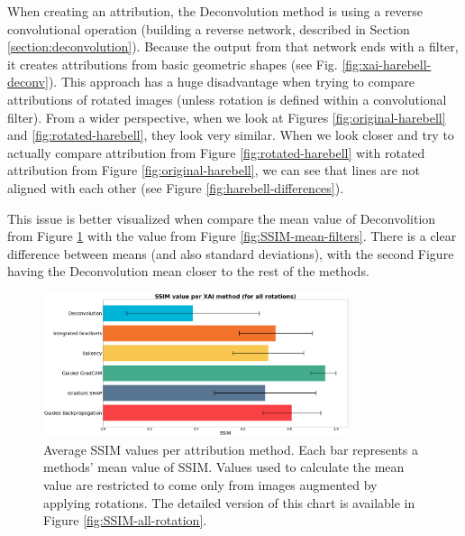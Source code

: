 \vspace{\baselineskip}

When creating an attribution, the Deconvolution method is using a reverse convolutional operation (building a reverse network, described in Section \ref{section:deconvolution}). Because the output from that network ends with a filter, it creates attributions from basic geometric shapes (see Fig. \ref{fig:xai-harebell-deconv}). This approach has a huge disadvantage when trying to compare attributions of rotated images (unless rotation is defined within a convolutional filter). From a wider perspective, when we look at Figures \ref{fig:original-harebell} and \ref{fig:rotated-harebell}, they look very similar. When we look closer and try to actually compare attribution from Figure \ref{fig:rotated-harebell} with rotated attribution from Figure \ref{fig:original-harebell}, we can see that lines are not aligned with each other (see Figure \ref{fig:harebell-differences}).

\vspace{\baselineskip}

This issue is better visualized when compare the mean value of Deconvolition from Figure \ref{fig:SSIM-mean-rotation} with the value from Figure \ref{fig:SSIM-mean-filters}. There is a clear difference between means (and also standard deviations), with the second Figure having the Deconvolution mean closer to the rest of the methods.

\begin{figure}[ht]
  \centering
  \includegraphics[width=0.8\textwidth]{results/augment-img/rotation-all.png}
  \caption{Average SSIM values per attribution method. Each bar represents a methods' mean value of SSIM. Values used to calculate the mean value are restricted to come only from images augmented by applying rotations. The detailed version of this chart is available in Figure \ref{fig:SSIM-all-rotation}.}\label{fig:SSIM-mean-rotation}
\end{figure}


